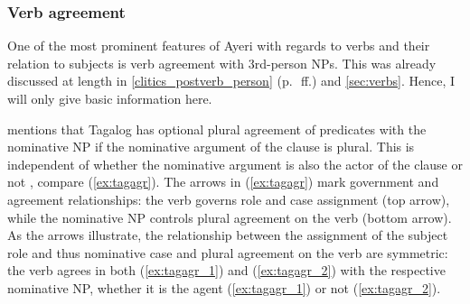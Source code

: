 \subsubsection{Verb agreement}
\label{subsubsec:verbagr}

One of the most prominent features of Ayeri with regards to verbs and their
relation to subjects is verb agreement with 3rd-person NPs. This was already
discussed at length in \autoref{clitics_postverb_person} 
(p.~\pageref{clitics_postverb_person}\,ff.) and \autoref{sec:verbs}. Hence, I
will only give basic information here.

\citet{kroeger1991} mentions that Tagalog has optional plural agreement of
predicates with the nominative NP if the nominative argument of the clause is
plural. This is independent of whether the nominative argument is also the
actor of the clause or not \citep[24--25]{kroeger1991}, compare
(\ref{ex:tagagr}). The arrows in (\ref{ex:tagagr}) mark government and
agreement relationships: the verb governs role and case assignment (top arrow),
while the nominative NP controls plural agreement on the verb (bottom arrow).
As the arrows illustrate, the relationship between the assignment of the
subject role and thus nominative case and plural agreement on the verb are
symmetric: the verb agrees in both (\ref{ex:tagagr_1}) and (\ref{ex:tagagr_2})
with the respective nominative NP, whether it is the agent (\ref{ex:tagagr_1})
or not (\ref{ex:tagagr_2}).

